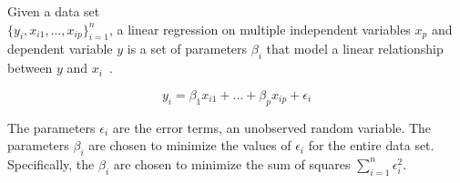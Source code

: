  Given a data set \\ $\{y_i,x_{i1},\ldots,x_{ip}\}^n_{i=1}$, a linear regression on multiple independent variables $x_{p}$ and dependent variable $y$ is a set of parameters $\beta_i$ that model a linear relationship between $y$ and $x_{i}$~\cite{CMUStatsBook}.

\begin{displaymath}{
y_i = \beta_1 x_{i1}+\ldots+\beta_{p}x_{ip}+\epsilon_i
}\end{displaymath}

The parameters $\epsilon_i$ are the error terms, an unobserved random variable.  The parameters $\beta_i$ are chosen to minimize the values of $\epsilon_i$ for the entire data set.  Specifically, the $\beta_i$ are chosen to minimize the sum of squares $\sum_{i=1}^{n} \epsilon^2_i$.

